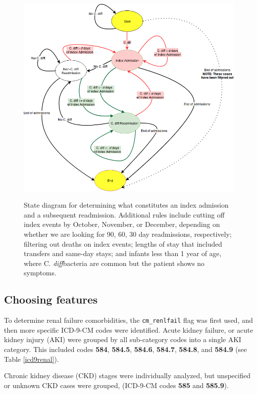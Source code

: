 \documentclass[12pt]{ociamthesis}\usepackage[]{graphicx}\usepackage[]{color}
\newcommand{\cdiff}{C. \textit{diff}}
\begin{document}
\begin{figure}[h]
\centering
\includegraphics[scale=0.5]{readmission-state-diagram.png} 
\label{fig:readmission-state-diagram} 
\caption{State diagram for determining what constitutes an index admission and a subsequent readmission.
Additional rules include cutting off index events by October, November, or December, depending on whether we are looking for 90, 60, 30 day readmissions, respectively;
filtering out deaths on index events;
lengths of stay that included transfers and same-day stays;
and infants less than 1 year of age, where \cdiff bacteria are common but the patient shows no symptoms.}
\end{figure}


\subsection{Choosing features}

To determine renal failure comorbidities, the \texttt{cm\_renlfail} flag was first used, and then more specific ICD-9-CM codes were identified. Acute kidney failure, 
or acute kidney injury (AKI) were grouped by all sub-category codes into a single AKI category. This included codes \textbf{584}, \textbf{584.5}, \textbf{584.6}, \textbf{584.7}, 
\textbf{584.8}, and \textbf{584.9} (see Table \ref{icd9renal}).

Chronic kidney disease (CKD) stages were individually analyzed, but unspecified or unknown CKD cases were grouped, (ICD-9-CM codes \textbf{585} and \textbf{585.9}). 
\end{document}
